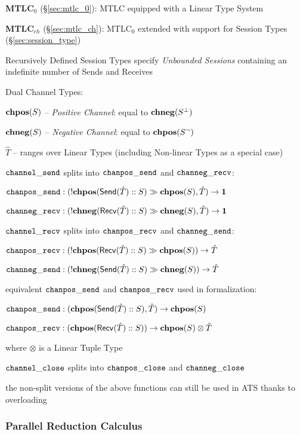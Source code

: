 \fist \textbf{MTLC$_0$} (\S\ref{sec:mtlc_0}): MTLC equipped with a
Linear Type System

\fist \textbf{MTLC$_{ch}$} (\S\ref{sec:mtlc_ch}): MTLC$_0$ extended
with support for Session Types (\S\ref{sec:session_type})

Recursively Defined Session Types specify \emph{Unbounded Sessions}
containing an indefinite number of Sends and Receives


Dual Channel Types:

$\mathbf{chpos}(S)$ -- \emph{Positive Channel}: equal to $\mathbf{chneg}(S^\bot)$

$\mathbf{chneg}(S)$ -- \emph{Negative Channel}: equal to $\mathbf{chpos}(S^\neg)$

$\hat{T}$ -- ranges over Linear Types (including Non-linear Types as a
special case)

$\mathtt{channel\_send}$ splits into $\mathtt{chanpos\_send}$ and $\mathtt{channeg\_recv}$:

$\mathtt{chanpos\_send} : (!\mathbf{chpos}(\mathsf{Send}(\hat{T})::S) \gg \mathbf{chpos}(S), \hat{T})
\rightarrow \mathsf{\mathbf{1}}$

$\mathtt{channeg\_recv} : (!\mathbf{chneg}(\mathsf{Recv}(\hat{T})::S) \gg \mathbf{chneg}(S), \hat{T})
\rightarrow \mathsf{\mathbf{1}}$

$\mathtt{channel\_recv}$ splits into $\mathtt{chanpos\_recv}$ and $\mathtt{channeg\_send}$:

$\mathtt{chanpos\_recv} : (!\mathbf{chpos}(\mathsf{Recv}(\hat{T})::S) \gg \mathbf{chpos}(S))
\rightarrow \hat{T}$

$\mathtt{channeg\_send} : (!\mathbf{chneg}(\mathsf{Send}(\hat{T})::S) \gg \mathbf{chneg}(S))
\rightarrow \hat{T}$

equivalent $\mathtt{chanpos\_send}$ and $\mathtt{chanpos\_recv}$ used in formalization:

$\mathtt{chanpos\_send} : (\mathbf{chpos}(\mathsf{Send}(\hat{T})::S), \hat{T}) \rightarrow \mathbf{chpos}(S)$

$\mathtt{chanpos\_recv} : (\mathbf{chpos}(\mathsf{Recv}(\hat{T})::S)) \rightarrow \mathbf{chpos}(S)
\otimes \hat{T}$

where $\otimes$ is a Linear Tuple Type

$\mathtt{channel\_close}$ splits into $\mathtt{chanpos\_close}$ and $\mathtt{channeg\_close}$

the non-split versions of the above functions can still be used in ATS
thanks to overloading

\endgroup



\subsubsection{Parallel Reduction Calculus}
\label{sec:parallel_reduction_calculus}

